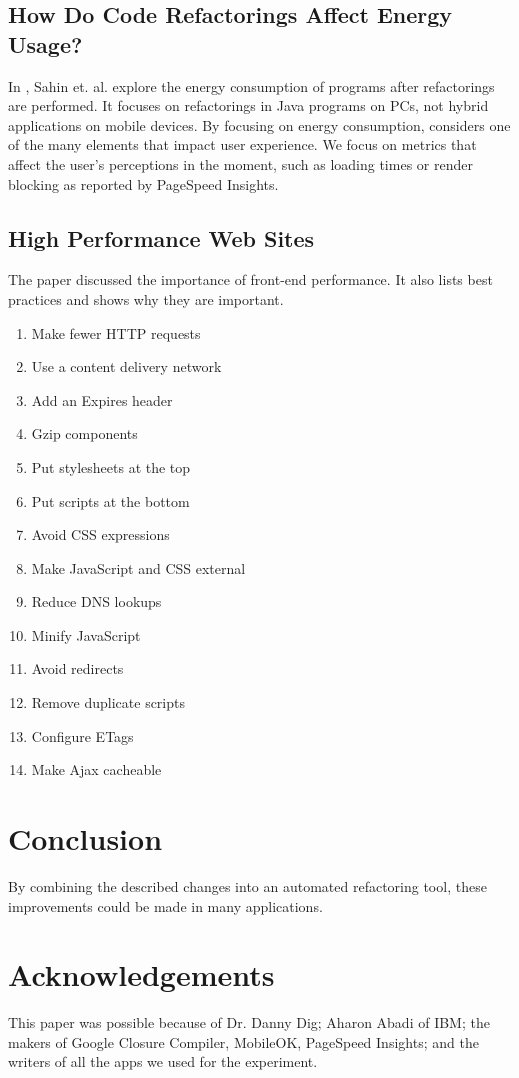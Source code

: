 \documentclass{acm_proc_article-sp}
\begin{document}
\subsection{How Do Code Refactorings Affect Energy Usage? \cite{Sahin:2014:CRA:2652524.2652538}}
In \cite{Sahin:2014:CRA:2652524.2652538}, Sahin et. al. explore the energy consumption of programs after refactorings are performed. 
It focuses on refactorings in Java programs on PCs, not hybrid applications on mobile devices. 
By focusing on energy consumption, \cite{Sahin:2014:CRA:2652524.2652538} considers one of the many elements that impact user experience. 
We focus on metrics that affect the user's perceptions in the moment, such as loading times or render blocking as reported by PageSpeed Insights.

\subsection{High Performance Web Sites\cite{souders2008high}}
The paper discussed the importance of front-end performance.
It also lists best practices and shows why they are important.
\vspace{-1.0em}
\begin{enumerate}\itemsep1pt \parskip0pt 
	\item Make fewer HTTP requests
	\item Use a content delivery network
	\item Add an Expires header
	\item Gzip components
	\item Put stylesheets at the top
	\item Put scripts at the bottom
	\item Avoid CSS expressions
	\item Make JavaScript and CSS external
	\item Reduce DNS lookups
	\item Minify JavaScript
	\item Avoid redirects
	\item Remove duplicate scripts
	\item Configure ETags
	\item Make Ajax cacheable
\end{enumerate}
\section{Conclusion}
By combining the described changes into an automated refactoring tool, these improvements could be made in many applications.

\section{Acknowledgements}
This paper was possible because of Dr. Danny Dig; Aharon Abadi of IBM; the makers of Google Closure Compiler, MobileOK, PageSpeed Insights; and the writers of all the apps we used for the experiment.



\end{document}
